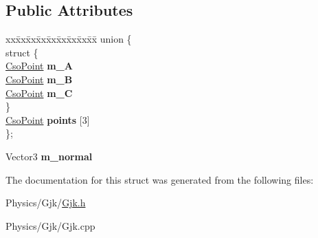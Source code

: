 \subsection*{Public Attributes}
\begin{DoxyCompactItemize}
\item 
\mbox{\label{structGjk_1_1CsoTriangle_afc388c5a11f4edf9d95dde1e2baa1453}} 
\begin{tabbing}
xx\=xx\=xx\=xx\=xx\=xx\=xx\=xx\=xx\=\kill
union \{\\
\mbox{\label{unionGjk_1_1CsoTriangle_1_1_0D14_ab7b8f7296e9f94e1b6ed18b552cae39e}} 
\>struct \{\\
\>\>\hyperlink{structGjk_1_1CsoPoint}{CsoPoint} {\bfseries m\_A}\\
\>\>\hyperlink{structGjk_1_1CsoPoint}{CsoPoint} {\bfseries m\_B}\\
\>\>\hyperlink{structGjk_1_1CsoPoint}{CsoPoint} {\bfseries m\_C}\\
\>\} \\
\>\hyperlink{structGjk_1_1CsoPoint}{CsoPoint} {\bfseries points} \mbox{[}3\mbox{]}\\
\}; \\

\end{tabbing}\item 
\mbox{\label{structGjk_1_1CsoTriangle_a328ee0494e17af474a8c9f524a15d8da}} 
Vector3 {\bfseries m\+\_\+normal}
\end{DoxyCompactItemize}


The documentation for this struct was generated from the following files\+:\begin{DoxyCompactItemize}
\item 
Physics/\+Gjk/\hyperlink{Gjk_8h}{Gjk.\+h}\item 
Physics/\+Gjk/Gjk.\+cpp\end{DoxyCompactItemize}
